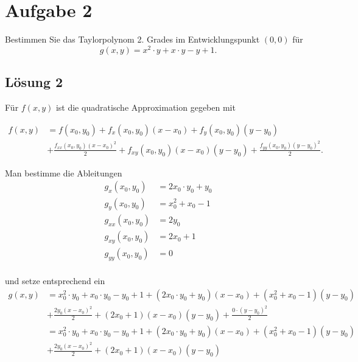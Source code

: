 \documentclass[main.tex]{subfiles}
\begin{document}
\section{Aufgabe 2}
Bestimmen Sie das Taylorpolynom 2. Grades im Entwicklungspunkt $(0,0)$ für
$$
    g(x,y) = x^2\cdot y + x\cdot y - y + 1.
$$


\subsection{Lösung 2}

Für $f(x,y)$ ist die quadratische Approximation gegeben mit

\begin{align*}
    f(x,y) &= f(x_0, y_0) + f_x(x_0, y_0)(x-x_0) + f_y(x_0, y_0)(y-y_0)\\
           &+ \frac{f_{xx}(x_0,y_0)(x-x_0)^2}{2} + f_{xy}(x_0,y_0)(x-x_0)(y-y_0) + \frac{f_{yy}(x_0,y_0)(y-y_0)^2}{2}.
\end{align*}

Man bestimme die Ableitungen
\begin{align*}
    g_x(x_0, y_0)    &= 2x_0\cdot y_0 + y_0 \\
    g_y(x_0, y_0)    &= x_0^2 + x_0 - 1 \\
    g_{xx}(x_0, y_0) &= 2y_0 \\
    g_{xy}(x_0, y_0) &= 2x_0 + 1 \\
    g_{yy}(x_0, y_0) &= 0 \\
\end{align*}

und setze entsprechend ein
\begin{align*}
    g(x,y) &= x_0^2\cdot y_0 + x_0\cdot y_0 - y_0 + 1 
            + (2x_0\cdot y_0 + y_0)(x-x_0)
            + (x_0^2 + x_0 - 1)(y-y_0) \\
           &+ \frac{2y_0(x-x_0)^2}{2} 
            + (2x_0 + 1)(x-x_0)(y-y_0) 
            + \frac{0\cdot (y-y_0)^2}{2} \\
           &= x_0^2\cdot y_0 + x_0\cdot y_0 - y_0 + 1 
            + (2x_0\cdot y_0 + y_0)(x-x_0)
            + (x_0^2 + x_0 - 1)(y-y_0) \\
           &+ \frac{2y_0(x-x_0)^2}{2} 
            + (2x_0 + 1)(x-x_0)(y-y_0)
\end{align*}
\end{document}

